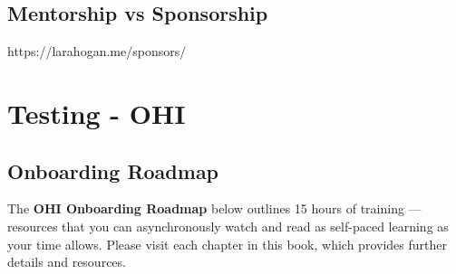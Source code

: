 \documentclass[
  letterpaper,
  DIV=11,
  numbers=noendperiod]{scrreprt}
\begin{document}
\hypertarget{mentorship-vs-sponsorship}{%
\section{Mentorship vs Sponsorship}\label{mentorship-vs-sponsorship}}

https://larahogan.me/sponsors/

\hypertarget{testing-ohi}{%
\chapter{Testing - OHI}\label{testing-ohi}}

\hypertarget{onboarding-roadmap}{%
\section{Onboarding Roadmap}\label{onboarding-roadmap}}

The \textbf{OHI Onboarding Roadmap} below outlines 15 hours of training
--- resources that you can asynchronously watch and read as self-paced
learning as your time allows. Please visit each chapter in this book,
which provides further details and resources.
\end{document}
